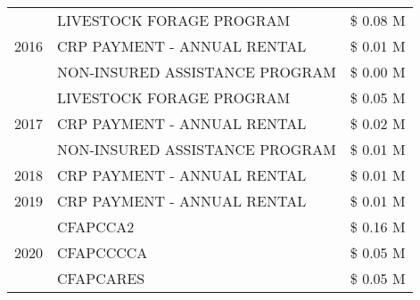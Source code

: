 \begin{tabular}{llr}
\cline{1-3}
\multirow[t]{3}{*}{2016} & LIVESTOCK FORAGE PROGRAM                      & \$ 0.08 M \\
 & CRP PAYMENT - ANNUAL RENTAL                   & \$ 0.01 M \\
 & NON-INSURED ASSISTANCE PROGRAM                & \$ 0.00 M \\
\cline{1-3}
\multirow[t]{3}{*}{2017} & LIVESTOCK FORAGE PROGRAM & \$ 0.05 M \\
 & CRP PAYMENT - ANNUAL RENTAL & \$ 0.02 M \\
 & NON-INSURED ASSISTANCE PROGRAM & \$ 0.01 M \\
\cline{1-3}
2018 & CRP PAYMENT - ANNUAL RENTAL & \$ 0.01 M \\
\cline{1-3}
2019 & CRP PAYMENT - ANNUAL RENTAL & \$ 0.01 M \\
\cline{1-3}
\multirow[t]{3}{*}{2020} & CFAPCCA2 & \$ 0.16 M \\
 & CFAPCCCCA & \$ 0.05 M \\
 & CFAPCARES & \$ 0.05 M \\
\cline{1-3}
\bottomrule
\end{tabular}
